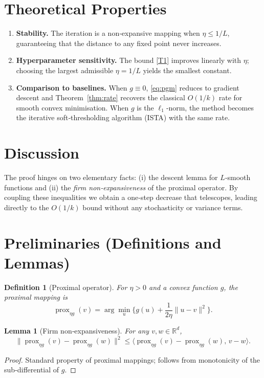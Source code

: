 \documentclass{article}
\newtheorem{lemma}{Lemma}
\newtheorem{definition}{Definition}
\begin{document}
\section*{Theoretical Properties}
\begin{enumerate}[label=\arabic*.]
\item \textbf{Stability.} The iteration is a non‑expansive mapping when $\eta\le1/L$, guaranteeing that the distance to any fixed point never increases.
\item \textbf{Hyperparameter sensitivity.} The bound \eqref{T1} improves linearly with $\eta$; choosing the largest admissible $\eta=1/L$ yields the smallest constant.
\item \textbf{Comparison to baselines.} When $g\equiv0$, \eqref{eq:pgm} reduces to gradient descent and Theorem~\ref{thm:rate} recovers the classical $O(1/k)$ rate for smooth convex minimisation. When $g$ is the $\ell_{1}$‑norm, the method becomes the iterative soft‑thresholding algorithm (ISTA) with the same rate.
\end{enumerate}

\section*{Discussion}
The proof hinges on two elementary facts: (i) the descent lemma for $L$‑smooth functions and (ii) the \emph{firm non‑expansiveness} of the proximal operator. By coupling these inequalities we obtain a one‑step decrease that telescopes, leading directly to the $O(1/k)$ bound without any stochasticity or variance terms.

\newpage
\section*{Preliminaries (Definitions and Lemmas)}
\begin{definition}[Proximal operator]
For $\eta>0$ and a convex function $g$, the proximal mapping is
\[
\operatorname{prox}_{\eta g}(v)=\arg\min_{u}
\Big\{ g(u)+\frac{1}{2\eta}\|u-v\|^{2}\Big\}.
\]
\end{definition}

\begin{lemma}[Firm non‑expansiveness]
\label{lem:nonexp}
For any $v,w\in\mathbb{R}^{d}$,
\[
\|\operatorname{prox}_{\eta g}(v)-\operatorname{prox}_{\eta g}(w)\|^{2}
\le \langle \operatorname{prox}_{\eta g}(v)-\operatorname{prox}_{\eta g}(w),\,v-w\rangle .
\tag{L1}
\]
\end{lemma}
\begin{proof}
Standard property of proximal mappings; follows from monotonicity of the sub‑differential of $g$.
\end{proof}
\end{document}
